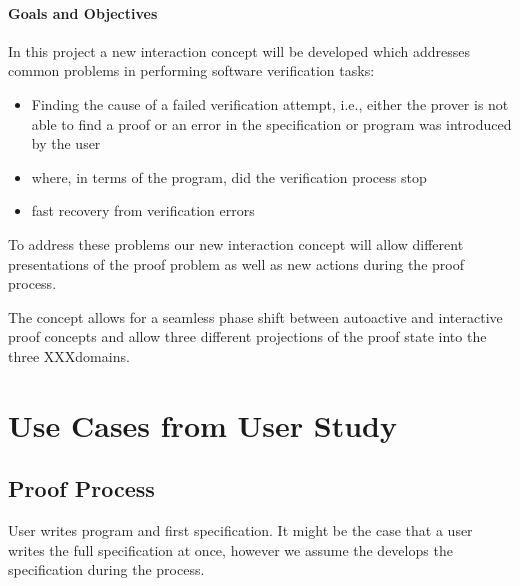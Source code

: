 \documentclass{article}
\begin{document}
\paragraph{Goals and Objectives}
In this project a new interaction concept will be developed which addresses 
common problems in performing software verification tasks:

\begin{itemize}
 \item Finding the cause of a failed verification attempt, i.e., either the 
prover is not able to find a proof or an error in the specification or program 
was introduced by the user
\item where, in terms of the program, did the verification process stop
\item fast recovery from verification errors 
\end{itemize}

To address these problems our new interaction concept will allow different 
presentations of the proof problem as well as new actions during the proof 
process.

The concept allows for a seamless phase shift between autoactive and 
interactive proof concepts and allow three different projections of the proof 
state into the three XXXdomains.

    	


\section{Use Cases from User Study}
\subsection{Proof Process}
User writes program and first specification. It might be the case that a user 
writes the full specification at once, however we assume the develops the 
specification during the process.
\end{document}
